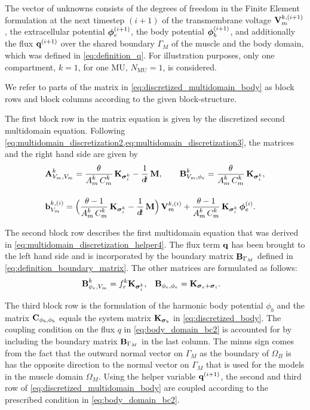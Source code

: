 The vector of unknowns consists of the degrees of freedom in the Finite Element formulation at the next timestep $(i+1)$ of the transmembrane voltage $\textbf{V}_m^{k,(i+1)}$, the extracellular potential $\boldsymbol{\phi}_{e}^{(i+1)}$, the body potential $\boldsymbol{\phi}_{b}^{(i+1)}$, and additionally the flux $\textbf{q}^{(i+1)}$ over the shared boundary $\Gamma_M$ of the muscle and the body domain, which was defined in \cref{eq:definition_q}. For illustration purposes, only one compartment, $k=1$, for one MU, $N_\text{MU}=1$, is considered.

We refer to parts of the matrix in \cref{eq:discretized_multidomain_body} as block rows and block columns according to the given block-structure.

The first block row in the matrix equation is given by the discretized second multidomain equation. Following \cref{eq:multidomain_discretization2,eq:multidomain_discretization3}, the matrices and the right hand side are given by
\begin{align*}
  &\bfA^k_{V_m,V_m} = \dfrac{\theta}{A_m^k\,C_m^k}\bfK_{\bfsigma_i^k} -\dfrac{1}{\dt}\bfM, \qquad
  \bfB^k_{V_m,\phi_e} = \dfrac{\theta}{A_m^k\,C_m^k}\bfK_{\bfsigma_i^k},\\[4mm]
  &\bfb_{V_m}^{k,(i)} = \Big( \dfrac{\theta-1}{A_m^k\,C_m^k}\bfK_{\bfsigma_i^k} - \dfrac{1}{\dt}\bfM\Big)\,\bfV_m^{k,(i)} 
      + \dfrac{\theta - 1}{A_m^k\,C_m^k}\bfK_{\bfsigma_i^k}\,\bfphi_e^{(i)}.
\end{align*}
%

The second block row describes the first multidomain equation that was derived in \cref{eq:multidomain_discretization_helper4}. The flux term $\textbf{q}$ has been brought to the left hand side and is incorporated by the boundary matrix $\textbf{B}_{\Gamma_M}$ defined in \cref{eq:definition_boundary_matrix}. The other matrices are formulated as follows:
%
\begin{align*}
  \textbf{B}_{\phi_e,V_m}^k &= f_r^k \textbf{K}_{\boldsymbol{\sigma}_i^k}, & 
  \textbf{B}_{\phi_e,\phi_e} &= \textbf{K}_{\boldsymbol{\sigma}_e + \boldsymbol{\sigma}_i}.
\end{align*}
%

The third block row is the formulation of the harmonic body potential $\phi_b$ and the matrix $\textbf{C}_{\phi_b,\phi_b}$ equals the system matrix $\textbf{K}_{\boldsymbol{\sigma}_b}$ in \cref{eq:discretized_body}. The coupling condition on the flux $q$ in  \cref{eq:body_domain_bc2} is accounted for by including the boundary matrix $\textbf{B}_{\Gamma_M}$ in the last column. The minus sign comes from the fact that the outward normal vector on $\Gamma_M$ as the boundary of $\Omega_B$ is has the opposite direction to the normal vector on $\Gamma_M$ that is used for the models in the muscle domain $\Omega_M$. Using the helper variable $\textbf{q}^{(i+1)}$, the second and third row of \cref{eq:discretized_multidomain_body} are coupled according to the prescribed condition in \cref{eq:body_domain_bc2}.

